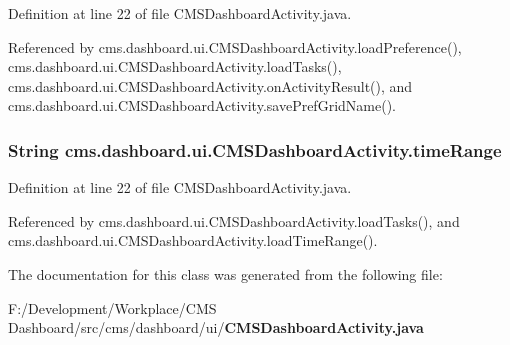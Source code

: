 \-Definition at line 22 of file \-C\-M\-S\-Dashboard\-Activity.\-java.



\-Referenced by cms.\-dashboard.\-ui.\-C\-M\-S\-Dashboard\-Activity.\-load\-Preference(), cms.\-dashboard.\-ui.\-C\-M\-S\-Dashboard\-Activity.\-load\-Tasks(), cms.\-dashboard.\-ui.\-C\-M\-S\-Dashboard\-Activity.\-on\-Activity\-Result(), and cms.\-dashboard.\-ui.\-C\-M\-S\-Dashboard\-Activity.\-save\-Pref\-Grid\-Name().

\subsubsection[{time\-Range}]{\setlength{\rightskip}{0pt plus 5cm}\-String {\bf cms.\-dashboard.\-ui.\-C\-M\-S\-Dashboard\-Activity.\-time\-Range}\hspace{0.3cm}{\ttfamily  [package]}}\label{classcms_1_1dashboard_1_1ui_1_1_c_m_s_dashboard_activity_a6aee5e6f0955f73d8933525059991ab5}


\-Definition at line 22 of file \-C\-M\-S\-Dashboard\-Activity.\-java.



\-Referenced by cms.\-dashboard.\-ui.\-C\-M\-S\-Dashboard\-Activity.\-load\-Tasks(), and cms.\-dashboard.\-ui.\-C\-M\-S\-Dashboard\-Activity.\-load\-Time\-Range().



\-The documentation for this class was generated from the following file\-:\begin{DoxyCompactItemize}
\item 
\-F\-:/\-Development/\-Workplace/\-C\-M\-S Dashboard/src/cms/dashboard/ui/{\bf \-C\-M\-S\-Dashboard\-Activity.\-java}\end{DoxyCompactItemize}
